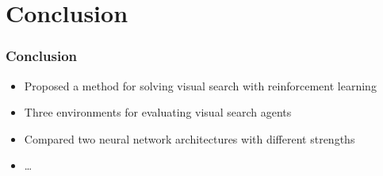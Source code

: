 \section{Conclusion}

\begin{frame}
    \frametitle{Conclusion}

    \begin{itemize}
        \item Proposed a method for solving visual search with reinforcement learning
        \item Three environments for evaluating visual search agents
        \item Compared two neural network architectures with different strengths
        \item \dots
    \end{itemize}
\end{frame}
